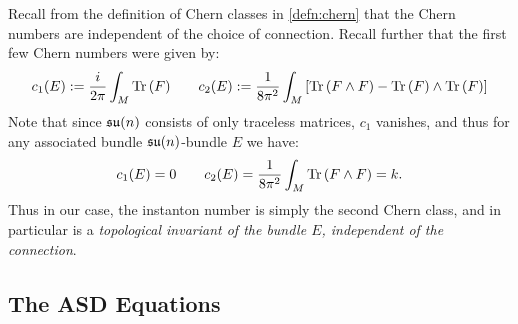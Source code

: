 		Recall from the definition of Chern classes in \ref{defn:chern} that the Chern numbers are independent of the choice of connection. Recall further that the first few Chern numbers were given by:
		\[
			c_1(E) := \frac{i}{2\pi} \int_{M} \mathrm{Tr}\,(F) \qquad c_2(E) := \frac{1}{8\pi^2} \int_M \left[\mathrm{Tr}\,(F \wedge F) - \mathrm{Tr}\,(F) \wedge \mathrm{Tr}\,(F)\right]
		\]
		Note that since $\frak{su}(n)$ consists of only traceless matrices, $c_1$ vanishes, and thus for any associated bundle $\frak{su}(n)$-bundle $E$ we have:
		\[
			c_1(E) = 0 \qquad c_2(E) = \frac{1}{8\pi^2} \int_M \mathrm{Tr}\,(F \wedge F) = k.
		\]
		Thus in our case, the instanton number is simply the second Chern class, and in particular is a \emph{topological invariant of the bundle $E$, independent of the connection}.
		

\subsection{The ASD Equations} %
\label{sub:the_asd_equations}

